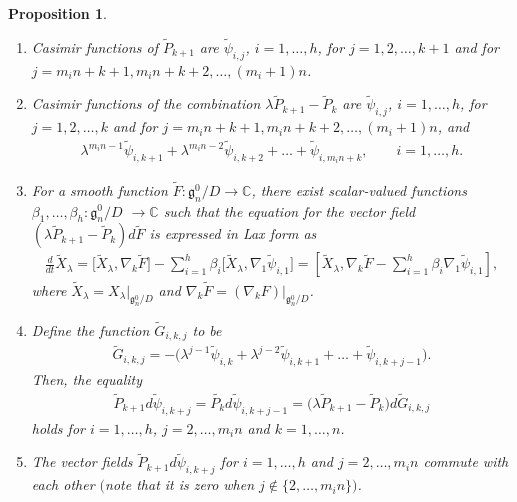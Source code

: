\documentclass[pdftex]{sigma}
\numberwithin{equation}{section}
\newtheorem{Proposition}[Theorem]{Proposition}
 { \theoremstyle{definition}
\newtheorem{Example}[Theorem]{Example}}
\begin{document}
\begin{Proposition}\label{proposition2.6}\quad
\begin{enumerate}\itemsep=0pt
\item[$(i)$] Casimir functions of $\widetilde{P}_{k+1}$ are $\widetilde{\psi}_{i,j}$, $i=1,\dots ,h$, for
$j=1,2,\dots ,k+1$ and for $j=m_in+k+1, m_in+k+2,\dots ,(m_i+1)n$.

\item[$(ii)$] Casimir functions of the combination $\lambda \widetilde{P}_{k+1} - \widetilde{P}_k$ are $\widetilde{\psi}_{i,j}$, $i=1,\dots ,h$, for $j=1,2,\dots ,k$ and for $j=m_in+k+1, m_in+k+2,\dots ,(m_i+1)n$, and
\begin{gather*}
\lambda ^{m_in-1}\widetilde{\psi}_{i,k+1} + \lambda ^{m_in-2}\widetilde{\psi}_{i, k+2}
 + \dots + \widetilde{\psi}_{i,m_in+k}, \qquad i=1,\dots ,h.
\end{gather*}
\item[$(iii)$] For a smooth function $\widetilde{F}\colon \mathfrak{g}^0_n/D \to \mathbb{C}$, there exist scalar-valued functions $\beta_1,\dots ,\beta_h \colon \mathfrak{g}^0_n/D$ $\to \mathbb{C}$ such that the equation for the vector field $(\lambda \widetilde{P}_{k+1} - \widetilde{P}_k)d\widetilde{F}$ is expressed in Lax form as
\begin{gather*}
\frac{d}{dt}\widetilde{X}_\lambda = \big[\widetilde{X}_\lambda , \nabla _k\widetilde{F}\big]
 - \sum^h_{i=1}\beta_i \big[\widetilde{X}_\lambda , \nabla _1 \widetilde{\psi}_{i,1}\big]
 = \left[\widetilde{X}_\lambda , \nabla _k\widetilde{F}-\sum^h_{i=1}\beta_i \nabla _1 \widetilde{\psi}_{i,1}\right],
\end{gather*}
where $\widetilde{X}_\lambda = X_\lambda |_{\mathfrak{g}^0_n/D}$ and $\nabla _k\widetilde{F} = (\nabla _kF)|_{\mathfrak{g}^0_n/D}$.

\item[$(iv)$] Define the function $\widetilde{G}_{i,k,j}$ to be
\begin{gather*}
\widetilde{G}_{i,k,j} = -\big( \lambda ^{j-1}\widetilde{\psi}_{i,k} + \lambda ^{j-2} \widetilde{\psi}_{i,k+1} + \dots + \widetilde{\psi}_{i,k+j-1}\big).
\end{gather*}
Then, the equality
\begin{gather*}
\widetilde{P}_{k+1}d\widetilde{\psi}_{i,k+j} = \widetilde{P_k}d\widetilde{\psi}_{i,k+j-1}
 = \big(\lambda \widetilde{P}_{k+1}-\widetilde{P}_k\big)d\widetilde{G}_{i,k,j}
\end{gather*}
holds for $i=1,\dots ,h$, $j=2,\dots ,m_in$ and $k=1,\dots ,n$.
\item[$(v)$] The vector fields $\widetilde{P}_{k+1}d\widetilde{\psi}_{i,k+j}$ for $i=1,\dots ,h$ and $j=2,\dots , m_in$
commute with each other $($note that it is zero when $j\notin \{ 2,\dots ,m_in\})$.
\end{enumerate}
\end{Proposition}
\end{document}
